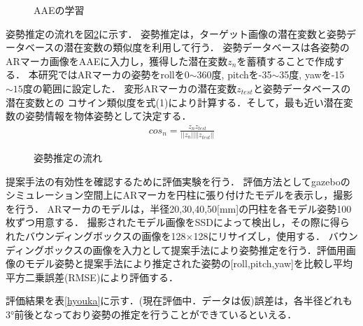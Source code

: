 \documentclass{jsarticle}
\begin{document}
\begin{figure}[ht]
\vspace{-10zh}
\setlength{\epsfxsize}{7.5cm}
\centerline{}
\vspace{8.5zh}
\caption{AAEの学習}
\label{BB}
\vspace{-1.0zh}
\end{figure}




姿勢推定の流れを図\ref{GG}に示す．
姿勢推定は，ターゲット画像の潜在変数と姿勢データベースの潜在変数の類似度を利用して行う．
姿勢データベースは各姿勢のARマーカ画像をAAEに入力し，獲得した潜在変数$z_n$を蓄積することで作成する．
本研究ではARマーカの姿勢をrollを0$\sim$360度, pitchを-35$\sim$35度, yawを-15$\sim15$度の範囲に設定した．
変形ARマーカの潜在変数$z_{test}$と姿勢データベースの潜在変数との
コサイン類似度を式(1)により計算する．そして，最も近い潜在変数の姿勢情報を物体姿勢として決定する．
\begin{eqnarray}
\label{cos}
cos_n=\frac{z_n z_{test}}{||z_n|| ||z_{test}||}
\end{eqnarray}


\begin{figure}[ht]
\vspace{-9zh}
\setlength{\epsfxsize}{7.5cm}
\centerline{}
\vspace{7zh}
\caption{姿勢推定の流れ}
\label{GG}
\vspace{-1.0zh}
\end{figure}





提案手法の有効性を確認するために評価実験を行う．
評価方法としてgazeboのシミュレーション空間上にARマーカを円柱に張り付けたモデルを表示し，撮影を行う．
ARマーカのモデルは，半径20,30,40,50[mm]の円柱を各モデル姿勢100枚ずつ用意する．
撮影されたモデル画像をSSDによって検出し，その際に得られたバウンディングボックスの画像を128$\times$128にリサイズし，使用する．
バウンディングボックスの画像を入力として提案手法により姿勢推定を行う．評価用画像のモデル姿勢と提案手法により推定された姿勢の[roll,pitch,yaw]を比較し平均平方二乗誤差(RMSE)により評価する．

評価結果を表\ref{hyouka}に示す．(現在評価中．データは仮)誤差は，各半径どれも3°前後となっており姿勢の推定を行うことができているといえる．
\end{document}
